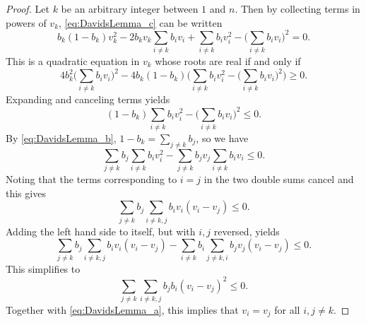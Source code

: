 \begin{proof}
    Let $k$ be an arbitrary integer between $1$ and $n$. 
    Then by collecting terms in powers of $v_k$, \eqref{eq:DavidsLemma_c} 
    can be written
    \begin{equation*}
    		b_k(1-b_k)v_k^2 - 2b_k v_k\sum_{i \neq k}b_i v_i + \sum_{i \neq k}b_i v_i^2 - \biggl(\sum_{i \neq k}b_i v_i\biggr)^{\!\! 2} = 0.  		
	\end{equation*}
	This is a quadratic equation in $v_k$ whose roots are real if and only if
	\begin{equation*}
    		4b_k^2\biggl(\sum_{i \neq k}b_i v_i\biggr)^{\!\! 2} - 4b_k(1-b_k)\Biggl(\sum_{i \neq k}b_i v_i^2 - \biggl(\sum_{i \neq k}b_i v_i\biggr)^{\!\! 2}\Biggr) \geq 0.
	\end{equation*}
	Expanding and canceling terms yields
	\begin{equation*}
    (1-b_k)\sum_{i \neq k}b_i v_i^2 - \biggl(\sum_{i \neq k}b_i v_i\biggr)^{\!\! 2} \leq 0.
	\end{equation*}
	By \eqref{eq:DavidsLemma_b}, $1-b_k = \sum_{j \ne k}b_j$, so we have
	\begin{equation*}
    		\sum_{j \neq k}b_j\sum_{i \neq k}b_i v_i^2 - \sum_{j \neq k}b_j v_j\sum_{i \neq k}b_i v_i \leq 0.
	\end{equation*}
	Noting that the terms corresponding to $i = j$ in the two double sums cancel and this gives
	\begin{equation*}
    		\sum_{j \neq k}b_j\sum_{i \neq k,j}b_i v_i(v_i - v_j) \leq 0.
	\end{equation*}
	Adding the left hand side to itself, but with $i, j$ reversed, yields
	\begin{equation*}
    		\sum_{j \neq k}b_j\sum_{i \neq k, j}b_i v_i(v_i - v_j) - \sum_{i \neq k}b_i\sum_{j \neq k, i}b_j v_j(v_i - v_j) \leq 0.
	\end{equation*}
	This simplifies to
	\begin{equation*}
    		\sum_{j \neq k}\sum_{i \neq k, j}b_j b_i(v_i - v_j)^2 \leq 0.
	\end{equation*}
	Together with \eqref{eq:DavidsLemma_a}, this implies that $v_i = v_j$ 
	for all $i, j \neq k$.
\end{proof}

